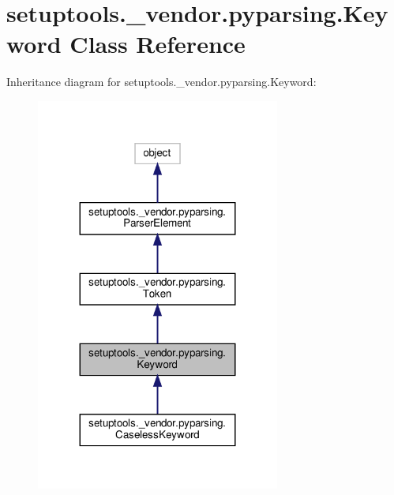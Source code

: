 \hypertarget{classsetuptools_1_1__vendor_1_1pyparsing_1_1Keyword}{}\section{setuptools.\+\_\+vendor.\+pyparsing.\+Keyword Class Reference}
\label{classsetuptools_1_1__vendor_1_1pyparsing_1_1Keyword}


Inheritance diagram for setuptools.\+\_\+vendor.\+pyparsing.\+Keyword\+:
\nopagebreak
\begin{figure}[H]
\begin{center}
\leavevmode
\includegraphics[width=227pt]{classsetuptools_1_1__vendor_1_1pyparsing_1_1Keyword__inherit__graph}
\end{center}
\end{figure}


